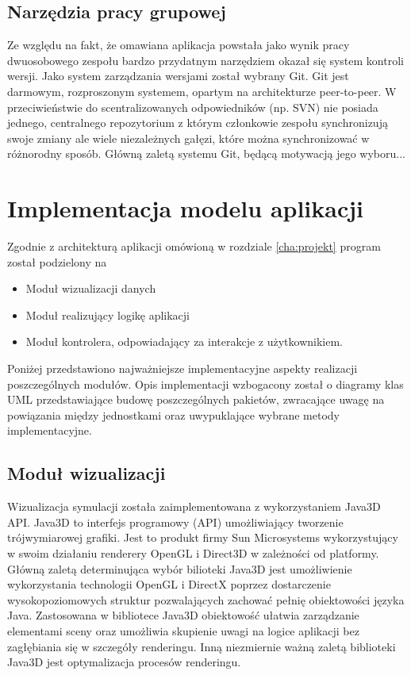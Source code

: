 \subsection {Narzędzia pracy grupowej}
Ze względu na fakt, że omawiana aplikacja powstała jako wynik pracy dwuosobowego zespołu bardzo przydatnym narzędziem okazał się system kontroli wersji. Jako system zarządzania wersjami został wybrany Git.
Git jest darmowym, rozproszonym systemem, opartym na architekturze peer-to-peer. W przeciwieństwie do scentralizowanych odpowiedników (np. SVN) nie posiada jednego, centralnego repozytorium z którym członkowie zespołu synchronizują swoje zmiany ale wiele niezależnych gałęzi, które można synchronizować w różnorodny sposób. Główną zaletą systemu Git, będącą motywacją jego wyboru...

\section {Implementacja modelu aplikacji}
Zgodnie z architekturą aplikacji omówioną w rozdziale \ref{cha:projekt} program został podzielony na 
\begin{itemize}
\item Moduł wizualizacji danych
\item Moduł realizujący logikę aplikacji
\item Moduł kontrolera, odpowiadający za interakcje z użytkownikiem.
\end{itemize}
Poniżej przedstawiono najważniejsze implementacyjne aspekty realizacji poszczególnych modułów.
Opis implementacji wzbogacony został o diagramy klas UML przedstawiające budowę poszczególnych pakietów, zwracające uwagę na powiązania między jednostkami oraz uwypuklające wybrane metody implementacyjne.
\subsection {Moduł wizualizacji}
Wizualizacja symulacji została zaimplementowana z wykorzystaniem Java3D API.
Java3D to interfejs programowy (API) umożliwiający tworzenie trójwymiarowej grafiki. Jest to produkt firmy Sun Microsystems wykorzystujący w swoim działaniu renderery OpenGL i Direct3D w zależności od platformy.
Główną zaletą determinująca wybór bilioteki Java3D jest umożliwienie wykorzystania technologii OpenGL i DirectX poprzez dostarczenie wysokopoziomowych struktur pozwalających zachować pełnię obiektowości języka Java. 
Zastosowana w bibliotece Java3D obiektowość ułatwia zarządzanie elementami sceny oraz umożliwia skupienie uwagi na logice aplikacji bez zagłębiania się w szczegóły renderingu. Inną niezmiernie ważną zaletą biblioteki Java3D jest optymalizacja procesów renderingu.
